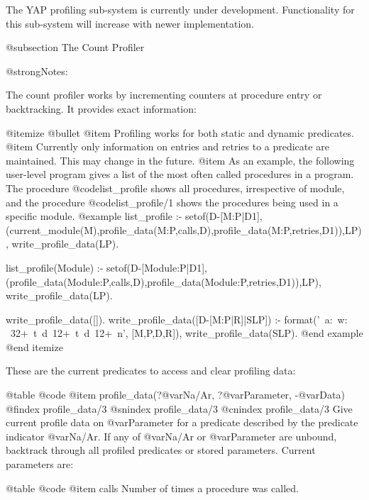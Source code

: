 {{{{{{{The YAP profiling sub-system is currently under
development. Functionality for this sub-system will increase with newer
implementation.

@subsection The Count Profiler

@strong{Notes:}

The count profiler works by incrementing counters at procedure entry or
backtracking. It provides exact information:

@itemize @bullet
@item Profiling works for both static and dynamic predicates.
@item Currently only information on entries and retries to a predicate
are maintained. This may change in the future.
@item As an example, the following user-level program gives a list of
the most often called procedures in a program. The procedure
@code{list_profile} shows all procedures, irrespective of module, and
the procedure @code{list_profile/1} shows the procedures being used in
a specific module.
@example
list_profile :-
        setof(D-[M:P|D1],(current_module(M),profile_data(M:P,calls,D),profile_data(M:P,retries,D1)),LP),
        write_profile_data(LP).

list_profile(Module) :-
        setof(D-[Module:P|D1],(profile_data(Module:P,calls,D),profile_data(Module:P,retries,D1)),LP),
        write_profile_data(LP).

write_profile_data([]).
write_profile_data([D-[M:P|R]|SLP]) :-
        format('~a:~w: ~32+~t~d~12+~t~d~12+~n', [M,P,D,R]),
        write_profile_data(SLP).
@end example
@end itemize

These are  the current predicates to access and clear profiling data:

@table @code
@item profile_data(?@var{Na/Ar}, ?@var{Parameter}, -@var{Data})
@findex profile_data/3
@snindex profile_data/3
@cnindex profile_data/3
Give current profile data on @var{Parameter} for a predicate described
by the predicate indicator @var{Na/Ar}. If any of @var{Na/Ar} or
@var{Parameter} are unbound, backtrack through all profiled predicates
or stored parameters. Current parameters are:

@table @code
@item calls
Number of times a procedure was called.

}}}}}}}
